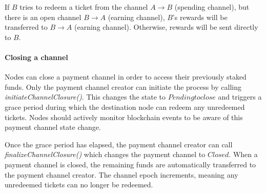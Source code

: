 If $B$ tries to redeem a ticket from the channel $A\rightarrow B$ (spending channel), but there is an open channel $B\rightarrow A$ (earning channel), $B$'s rewards will be transferred to $B\rightarrow A$ (earning channel). Otherwise, rewards will be sent directly to $B$.

\paragraph{Closing a channel}
Nodes can close a payment channel in order to access their previously staked funds. Only the payment channel creator can initiate the process by calling \textit{initiateChannelClosure()}. This changes the state to $Pending to close$ and triggers a grace period during which the destination node can redeem any unredeemed tickets. Nodes should actively monitor blockchain events to be aware of this payment channel state change.

Once the grace period has elapsed, the payment channel creator can call \textit{finalizeChannelClosure()} which changes the payment channel to $Closed$. When a payment channel is closed, the remaining funds are automatically transferred to the payment channel creator. The channel epoch increments, meaning any unredeemed tickets can no longer be redeemed.
